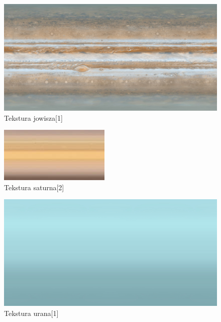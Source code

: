 \documentclass{article}
\begin{document}
        \FloatBarrier
        \begin{figure}[ht]
            \centering
            \includegraphics[width=\textwidth]{images/2k_jupiter.jpg}
            \caption{Tekstura jowisza[1]}
            \label{fig:jupiter}
        \end{figure}
        \FloatBarrier
        \begin{figure}[ht]
            \centering
            \includegraphics[width=\textwidth]{images/saturnmapthumb.jpg}
            \caption{Tekstura saturna[2]}
            \label{fig:saturn}
        \end{figure}
        \FloatBarrier
        \begin{figure}[ht]
            \centering
            \includegraphics[width=\textwidth]{images/2k_uranus.jpg}
            \caption{Tekstura urana[1]}
            \label{fig:uranus}
        \end{figure}
\end{document}
